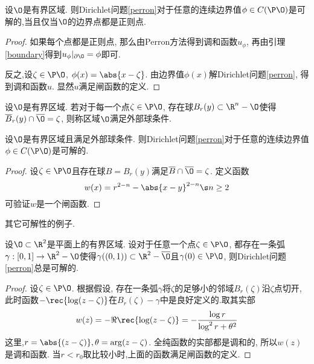 \begin{theorem}
    设$\O$是有界区域. 则Dirichlet问题\eqref{perron}对于任意的连续边界值$\phi \in C(\P \O)$是可解的,当且仅当$\O$的边界点都是正则点.
\end{theorem}
\begin{proof}
    如果每个点都是正则点, 那么由Perron方法得到调和函数$u_\phi$, 再由引理\eqref{boundary}得到$u_\phi|_{\partial \O}=\phi$即可. 
    \par 反之,设$\zeta \in \P \O$, $\phi(x)=\abs{x-\zeta}$. 由边界值$\phi(x)$解Dirichlet问题\eqref{perron}, 得到调和函数$u$. 显然$u$满足闸函数的定义.
\end{proof}
\begin{definition}
    设$\O$是有界区域. 若对于每一个点$\zeta \in \P \O$, 存在球$B_r(y) \subset \R^n-\O$使得$\overline{B}_r(y) \cap \overline{\O}=\zeta$, 则称区域$\O$满足外部球条件.
\end{definition}
\begin{theorem}
    设$\O$是有界区域且满足外部球条件.  则Dirichlet问题\eqref{perron}对于任意的连续边界值$\phi \in C(\P \O)$是可解的.
\end{theorem}
\begin{proof}
    设$\zeta \in \P \O$且存在球$B=B_r(y)$满足$\overline{B}\cap \overline{\O}=\zeta$. 定义函数
    \begin{equation}
        w(x)=r^{2-n}-\abs{x-y}^{2-n} \s n \ge 2
    \end{equation}
    可验证$w$是一个闸函数.
\end{proof}
其它可解性的例子. 
\begin{proposition}\label{regular_2d}
    设$\O \subset \R^2$是平面上的有界区域. 设对于任意一个点$\zeta \in \P \O$, 都存在一条弧$\gamma: [0,1] \to \R^2-\O$使得$\gamma((0,1)) \subset \R^2-\overline{\O}$且$\gamma(0) \in \P \O$, 则Dirichlet问题\eqref{perron}总是可解的.
\end{proposition}
\begin{proof}
    设$\zeta \in \P \O$. 根据假设, 存在一条弧$\gamma$将$\zeta$的足够小的邻域$B_r(\zeta)$沿$\zeta$点切开, 此时函数$-\rec{\log (z-\zeta)}$在$B_r(\zeta)-\gamma$中是良好定义的.取其实部 
    \begin{equation}
        w(z)=-\Re\rec{\log (z-\zeta)}=-\frac{\log r}{\log^2r+\theta^2}
    \end{equation}
    这里,$r=\abs{(z-\zeta)}, \theta=\arg(z-\zeta)$. 全纯函数的实部都是调和的, 所以$w(z)$是调和函数. 当$r<r_0$取比较小时,上面的函数满足闸函数的定义.
\end{proof}
